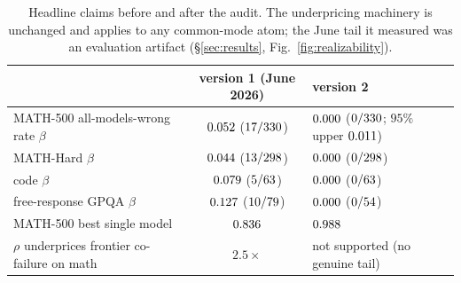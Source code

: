 \documentclass[11pt]{article}
\theoremstyle{plain}
\theoremstyle{definition}
\begin{document}
\begin{table}[h]\centering\small\setlength{\tabcolsep}{5pt}
\begin{tabular}{p{5.3cm}cp{5.4cm}}
\toprule
 & version 1 (June 2026) & version 2 \\
\midrule
MATH-500 all-models-wrong rate $\beta$ & $0.052$ ($17/330$) & $0.000$ ($0/330$; $95\%$ upper $0.011$) \\
MATH-Hard $\beta$ & $0.044$ ($13/298$) & $0.000$ ($0/298$) \\
code $\beta$ & $0.079$ ($5/63$) & $0.000$ ($0/63$) \\
free-response GPQA $\beta$ & $0.127$ ($10/79$) & $0.000$ ($0/54$) \\
MATH-500 best single model & $0.836$ & $0.988$ \\
$\rho$ underprices frontier co-failure on math & $2.5\times$ & not supported (no genuine tail) \\
\bottomrule
\end{tabular}
\caption{Headline claims before and after the audit. The underpricing machinery is unchanged and applies to any
common-mode atom; the June tail it measured was an evaluation artifact (\S\ref{sec:results}, Fig.~\ref{fig:realizability}).}\label{tab:audit}
\end{table}
\end{document}
